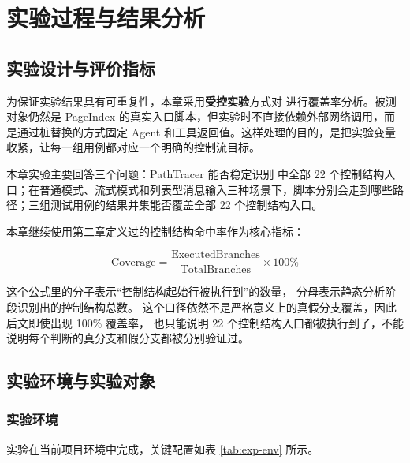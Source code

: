
\chapter{实验过程与结果分析}
\label{chap:experiment}

\section{实验设计与评价指标}

为保证实验结果具有可重复性，本章采用\textbf{受控实验}方式对  进行覆盖率分析。被测对象仍然是 PageIndex 的真实入口脚本，但实验时不直接依赖外部网络调用，而是通过桩替换的方式固定 Agent 和工具返回值。这样处理的目的，是把实验变量收紧，让每一组用例都对应一个明确的控制流目标。

本章实验主要回答三个问题：PathTracer 能否稳定识别  中全部 22 个控制结构入口；在普通模式、流式模式和列表型消息输入三种场景下，脚本分别会走到哪些路径；三组测试用例的结果并集能否覆盖全部 22 个控制结构入口。

本章继续使用第二章定义过的控制结构命中率作为核心指标：

\[
\text{Coverage} = \frac{\text{ExecutedBranches}}{\text{TotalBranches}} \times 100\%
\]

这个公式里的分子表示“控制结构起始行被执行到”的数量，%
分母表示静态分析阶段识别出的控制结构总数。%
这个口径依然不是严格意义上的真假分支覆盖，因此后文即使出现 100\% 覆盖率，%
也只能说明 22 个控制结构入口都被执行到了，不能说明每个判断的真分支和假分支都被分别验证过。

\section{实验环境与实验对象}

\subsection{实验环境}

实验在当前项目环境中完成，关键配置如表 \ref{tab:exp-env} 所示。

